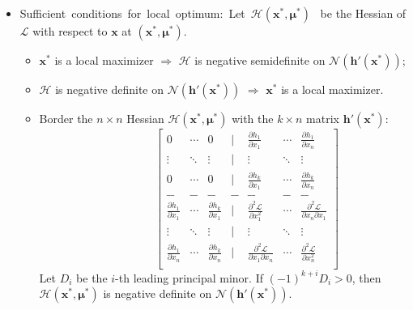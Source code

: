 \documentclass[%
 aip,
 jmp,%
 amsmath,amssymb,
 reprint,%
]{revtex4-1}
\renewcommand{\vec}[1]{\bm{#1}}
\newcommand{\mat}[1]{\bm{#1}}
\newcommand{\vfun}[1]{\bm{#1}}
\renewcommand{\L}{\mathcal{L}}       %
\newcommand{\HL}{\bm{\mathcal{H}}}   %
\newcommand{\N}{\mathcal{N}}    %
\begin{document}
\begin{enumerate}
\begin{itemize}[leftmargin=*]
            \item \mbox{Sufficient conditions for local optimum: Let $\HL(\vec{x}^*,\vec{\mu}^*)$ }
                be the Hessian of $\L$ with respect to $\vec{x}$ at $(\vec{x}^*,\vec{\mu}^*)$.
                \begin{itemize}[leftmargin=*]
                    \item $\vec{x}^*$ is a local maximizer $\Rightarrow$ $\HL$ is
                        negative semidefinite on $\N(\vfun{h}'(\vec{x}^*))$;
                    \item $\HL$ is negative definite on $\N(\vfun{h}'(\vec{x}^*))$
                        $\Rightarrow$ $\vec{x}^*$ is a local maximizer.
                    \item Border the $n \times n$ Hessian $\HL(\vec{x}^*,\vec{\mu}^*)$ with the $k \times n$ matrix $\vfun{h}'(\vec{x}^*)$:
                    \begin{equation*}
                        \qquad\qquad \begin{bmatrix}
                            0 & \cdots & 0 & | & \frac{\partial h_1}{\partial x_1} & \cdots & \frac{\partial h_1}{\partial x_n} \\
                            \vdots & \ddots & \vdots & | & \vdots & \ddots & \vdots \\
                            0 & \cdots & 0 & | & \frac{\partial h_k}{\partial x_1} & \cdots & \frac{\partial h_k}{\partial x_n} \\
                            \_\_ &  \_\_ &  \_\_ &  \_\_ &  \_\_ &  \_\_ &  \_\_  \\
                            \frac{\partial h_1}{\partial x_1} & \cdots & \frac{\partial h_k}{\partial x_1} & | & \frac{\partial^2 \L}{\partial x_1^2} & \cdots & \frac{\partial^2 \L}{\partial  x_n \partial x_1} \\
                            \vdots & \ddots & \vdots & | & \vdots & \ddots & \vdots \\
                            \frac{\partial h_1}{\partial x_n} & \cdots & \frac{\partial h_k}{\partial x_n} & | & \frac{\partial^2 \L}{\partial x_1 \partial x_n} & \cdots & \frac{\partial^2 \L}{\partial  x_n^2 } \\
                        \end{bmatrix}
                    \end{equation*}
                    Let $D_i$ be the $i$-th leading principal minor. If $(-1)^{k+i} D_i > 0$, then $\HL(\vec{x}^*,\vec{\mu}^*)$
                    is negative definite on $\N(\bm{h}'(\vec{x}^*))$.
                \end{itemize}


\end{itemize}
\end{enumerate}
\end{document}
